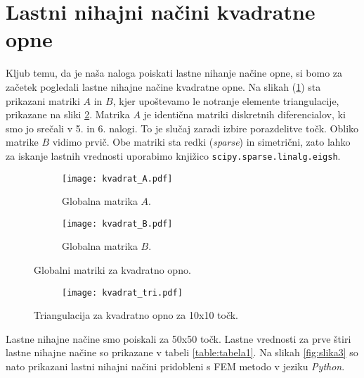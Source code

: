 \documentclass[12pt,a4paper]{article}
\begin{document}
\section*{Lastni nihajni načini kvadratne opne}

Kljub temu, da je naša naloga poiskati lastne nihanje načine opne, si bomo za začetek pogledali lastne nihajne načine kvadratne opne. Na slikah (\ref{fig:slika1}) sta prikazani matriki $A$ in $B$, kjer upoštevamo le notranje elemente triangulacije, prikazane na sliki \ref{fig:slika2}. Matrika $A$ je identična matriki diskretnih diferencialov, ki smo jo srečali v 5. in 6. nalogi. To je slučaj zaradi izbire porazdelitve točk. Obliko matrike $B$ vidimo prvič. Obe matriki sta redki (\textit{sparse}) in simetrični, zato lahko za iskanje lastnih vrednosti uporabimo knjižico \texttt{scipy.sparse.linalg.eigsh}.

\begin{figure}[H]
    \centering
    \begin{subfigure}[b]{0.45\textwidth}  			
        \texttt{[image: kvadrat\_A.pdf]}
        \caption{Globalna matrika $A$.}
    \end{subfigure}
    \begin{subfigure}[b]{0.45\textwidth}  			
        \texttt{[image: kvadrat\_B.pdf]}
        \caption{Globalna matrika $B$.}
    \end{subfigure}
    \caption{Globalni matriki za kvadratno opno.} \label{fig:slika1}
\end{figure}

\begin{figure}[H]
    \centering
    \begin{subfigure}[b]{0.45\textwidth}  			
        \texttt{[image: kvadrat\_tri.pdf]}
    \end{subfigure}
    \caption{Triangulacija za kvadratno opno za 10x10 točk.} \label{fig:slika2}
\end{figure}

\noindent Lastne nihajne načine smo poiskali za 50x50 točk. Lastne vrednosti za prve štiri lastne nihajne načine so prikazane v tabeli \ref{table:tabela1}. Na slikah \ref{fig:slika3} so nato prikazani lastni nihajni načini pridobleni s FEM metodo v jeziku \textit{Python}.
\end{document}
